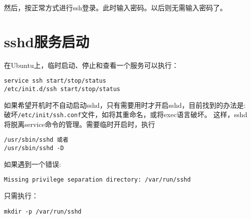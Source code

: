 然后，按正常方式进行ssh登录。此时输入密码。以后则无需输入密码了。

\section{sshd服务启动}
在Ubuntu上，临时启动、停止和查看一个服务可以执行：
\begin{verbatim}
service ssh start/stop/status
/etc/init.d/ssh start/stop/status
\end{verbatim}

如果希望开机时不自动启动sshd，只有需要用时才开启sshd，目前找到的办法是:破坏\verb+/etc/init/ssh.conf+文件，如将其重命名，或将exec语言破坏。
这样，sshd将脱离service命令的管理。需要临时开启时，执行
\begin{verbatim}
/usr/sbin/sshd 或者
/usr/sbin/sshd -D
\end{verbatim}

如果遇到一个错误:
\begin{verbatim}
Missing privilege separation directory: /var/run/sshd
\end{verbatim}

只需执行：
\begin{verbatim}
mkdir -p /var/run/sshd
\end{verbatim}




